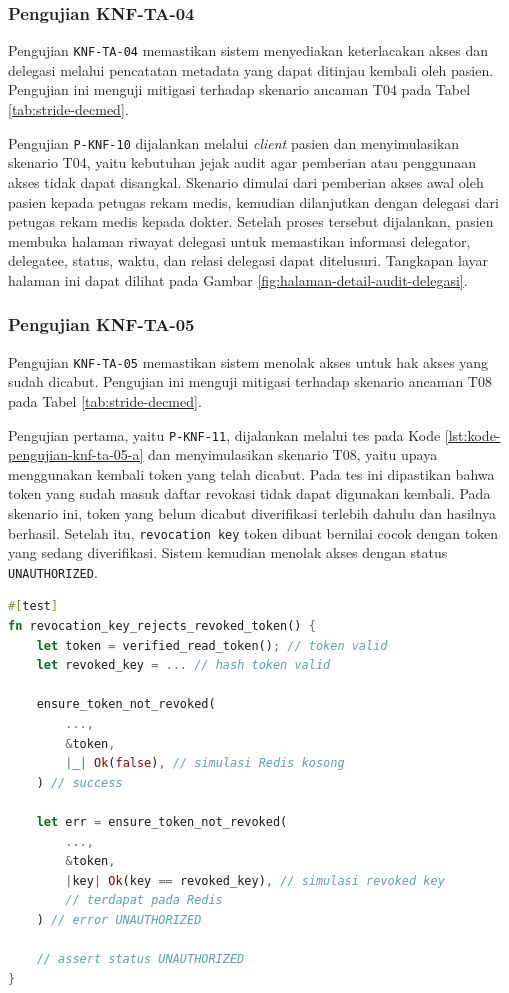 \documentclass[bahasa, 12pt, a4paper, onecolumn, oneside, final]{report}
\begin{document}
\subsubsection{Pengujian KNF-TA-04}
\label{subsubsec:pengujian-knf-ta-04}

Pengujian \texttt{KNF-TA-04} memastikan sistem menyediakan keterlacakan akses dan delegasi melalui pencatatan metadata yang dapat ditinjau kembali oleh pasien. Pengujian ini menguji mitigasi terhadap skenario ancaman T04 pada Tabel \ref{tab:stride-decmed}.

Pengujian \texttt{P-KNF-10} dijalankan melalui \textit{client} pasien dan menyimulasikan skenario T04, yaitu kebutuhan jejak audit agar pemberian atau penggunaan akses tidak dapat disangkal. Skenario dimulai dari pemberian akses awal oleh pasien kepada petugas rekam medis, kemudian dilanjutkan dengan delegasi dari petugas rekam medis kepada dokter. Setelah proses tersebut dijalankan, pasien membuka halaman riwayat delegasi untuk memastikan informasi delegator, delegatee, status, waktu, dan relasi delegasi dapat ditelusuri. Tangkapan layar halaman ini dapat dilihat pada Gambar \ref{fig:halaman-detail-audit-delegasi}.

\subsubsection{Pengujian KNF-TA-05}
\label{subsubsec:pengujian-knf-ta-05}

Pengujian \texttt{KNF-TA-05} memastikan sistem menolak akses untuk hak akses yang sudah dicabut. Pengujian ini menguji mitigasi terhadap skenario ancaman T08 pada Tabel \ref{tab:stride-decmed}.

Pengujian pertama, yaitu \texttt{P-KNF-11}, dijalankan melalui tes pada Kode \ref{lst:kode-pengujian-knf-ta-05-a} dan menyimulasikan skenario T08, yaitu upaya menggunakan kembali token yang telah dicabut. Pada tes ini dipastikan bahwa token yang sudah masuk daftar revokasi tidak dapat digunakan kembali. Pada skenario ini, token yang belum dicabut diverifikasi terlebih dahulu dan hasilnya berhasil. Setelah itu, \texttt{revocation key} token dibuat bernilai cocok dengan token yang sedang diverifikasi. Sistem kemudian menolak akses dengan status \texttt{UNAUTHORIZED}.

\begin{lstlisting}[language=Rust, caption=Pengujian P-KNF-11 untuk KNF-TA-05, label=lst:kode-pengujian-knf-ta-05-a]
#[test]
fn revocation_key_rejects_revoked_token() {
    let token = verified_read_token(); // token valid
    let revoked_key = ... // hash token valid

    ensure_token_not_revoked(
		...,
        &token,
        |_| Ok(false), // simulasi Redis kosong
    ) // success

    let err = ensure_token_not_revoked(
        ...,
        &token,
        |key| Ok(key == revoked_key), // simulasi revoked key 
		// terdapat pada Redis
    ) // error UNAUTHORIZED

    // assert status UNAUTHORIZED
}
\end{lstlisting}
\end{document}

